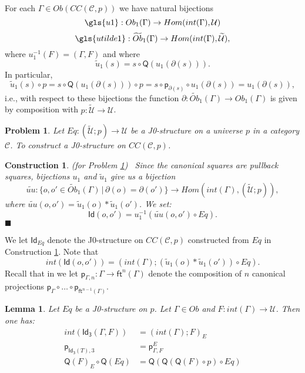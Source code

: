 \documentclass[12pt]{article}
\numberwithin{equation}{section}
\newenvironment{eq}{\begin{equation}}{\end{equation}}
\newtheorem{lemma}[proposition]{Lemma}
\newtheorem{problem}[proposition]{Problem}
\newtheorem{construction0}[proposition]{Construction}
\newenvironment{construction}[1]{\begin{construction0}(for Problem \ref{#1})\ }{$\blacksquare$ \end{construction0}}
\newcommand{\sr}{\rightarrow}
\newcommand{\wt}{\widetilde}
\newcommand{\toCC}{CC} %
\newcommand{\C}{{\mathcal C}}  %
\newcommand{\ft}{\mathsf{ft}}
\newcommand{\p}{\mathsf{p}}
\newcommand{\Id}{\mathsf{Id}} %
\newcommand{\Idx}{\mathsf{Id_3}} %
\newcommand{\U}{\mathcal{U}}
\newcommand{\Q}{\mathsf{Q}}
\newcommand{\Obwt}{\wt{Ob}}
\begin{document}
For each $\Gamma\in Ob(\toCC({\C},p))$ we have natural bijections
%
\begin{eq}
\label{2015.03.27.eq7b} \gls{u1}:Ob_1(\Gamma)\sr Hom(int(\Gamma),\U)
\end{eq}%
%
\begin{eq}
\label{2015.03.27.eq7a} \gls{utilde1}:\Obwt_1(\Gamma)\sr Hom(int(\Gamma),\wt{\U}),
\end{eq}%
%
where $u_1^{-1}(F)=(\Gamma,F)$ and where
%
\begin{eq}
\label{2015.03.31.eq5} \wt{u}_1(s)=s\circ \Q(u_1(\partial(s))).
\end{eq}%
%
In particular,
%
$$\wt{u}_1(s)\circ p=s\circ \Q(u_1(\partial(s)))\circ p=s\circ
\p_{\partial(s)}\circ u_1(\partial(s))=u_1(\partial(s)),$$
%
i.e., with respect to these bijections the function
$\partial:\Obwt_1(\Gamma)\sr Ob_1(\Gamma)$ is given by composition with
$p:\wt{\U}\sr \U$.
%
\begin{problem}
\label{2015.03.27.prob3} Let $Eq:(\wt{\U};p)\sr \U$ be a J0-structure on a
universe $p$ in a category $\C$. To construct a J0-structure on
$\toCC({\C},p)$.
\end{problem}
%
\begin{construction}{2015.03.27.prob3}\rm
\label{2015.03.27.constr3} Since the canonical squares are pullback squares,
bijections $u_1$ and $\wt{u}_1$ give us a bijection
%
$$\wt{uu}:\{o,o'\in\Obwt_1(\Gamma)\,|\,\partial(o)=\partial(o')\} \sr
Hom(int(\Gamma),(\wt{\U};p)),$$
%
where $\wt{uu}(o,o')=\wt{u}_1(o)*\wt{u}_1(o')$. We set:
%
$$\Id(o,o')=u_1^{-1}(\wt{uu}(o,o')\circ Eq).$$
%
\end{construction}
%
We let $\Id_{Eq}$ denote the J0-structure on $\toCC({\C},p)$ constructed
from $Eq$ in Construction \ref{2015.03.27.constr3}. Note that
%
\begin{eq}
\label{2015.03.31.eq1}
int(\Id(o,o'))=(int(\Gamma);(\wt{u}_1(o)*\wt{u}_1(o'))\circ Eq).
\end{eq}%
%
Recall that in \cite{Csubsystems} we let $\p_{\Gamma,n}:\Gamma\sr \ft^n(\Gamma)$
denote the composition of $n$ canonical projections $\p_{\Gamma}\circ \dots\circ
\p_{\ft^{n-1}(\Gamma)}$.
%
\begin{lemma}
\label{2015.03.27.l1} Let $Eq$ be a J0-structure on $p$. Let $\Gamma\in Ob$
and $F:int(\Gamma)\sr \U$. Then one has:
%
\begin{align*}
  int(\Idx(\Gamma,F))&=(int(\Gamma);F)_{E} \\
  \p_{\Idx(T),3} &= \p^E_{\Gamma,F} \\
  \Q(F)_{E}\circ \Q(Eq)&=\Q(\Q(\Q(F)\circ p)\circ Eq)
\end{align*}
%
%
\end{lemma}
\end{document}
